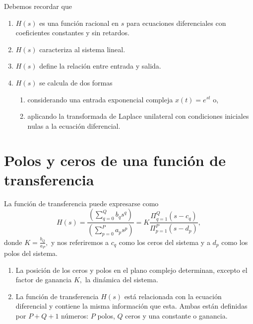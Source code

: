 Debemos recordar que
 \begin{enumerate}
 \item   $H(s)$ es una funci\'{o}n racional en $s$ para ecuaciones diferenciales con coeficientes
   constantes y sin retardos.
        
 \item   $H(s)$ caracteriza al sistema lineal.
   
 \item   $H(s)$ define la relaci\'{o}n entre entrada y salida.
           
 \item   $H(s)$ se calcula de dos formas
   \begin{enumerate}
   \item considerando una entrada exponencial compleja $x(t) = e^{s t}$ o,
   \item aplicando la transformada de Laplace unilateral con condiciones iniciales nulas a 
     la ecuaci\'{o}n diferencial.
   \end{enumerate}
 \end{enumerate}

\section{Polos y ceros de una funci\'{o}n de transferencia}

La funci\'{o}n de transferencia puede expresarse como 
\begin{equation}
        H\left( s\right) =
                \frac{\left( \sum_{q=0}^{Q}b_{q}s^{q}\right) }{\left(\sum_{p=0}^{P}a_{p}s^{p}\right) }=
                K\frac{\Pi _{q=1}^{Q}\left(s-c_{q}\right) }{\Pi _{p=1}^{P}\left( s-d_{p}\right) },
\end{equation}
donde $K=\frac{b_{Q}}{a_{P}},$ y nos referiremos a $c_{q}$ como los ceros del sistema y a $d_{p}$ como los 
polos del sistema.

\begin{enumerate}
        \item   La posici\'{o}n de los ceros y polos en el plano complejo determinan, excepto el factor de 
          ganancia $K,$ la din\'{a}mica del sistema.

        \item   La funci\'{o}n de transferencia $H\left( s\right) $ est\'{a} relacionada con la 
          ecuaci\'{o}n diferencial y contiene la misma informaci\'{o}n que esta. 
          Ambas est\'{a}n definidas por $P+Q+1$ n\'{u}meros: $P$ polos, $Q$ ceros y una constante o 
          ganancia.
\end{enumerate}

